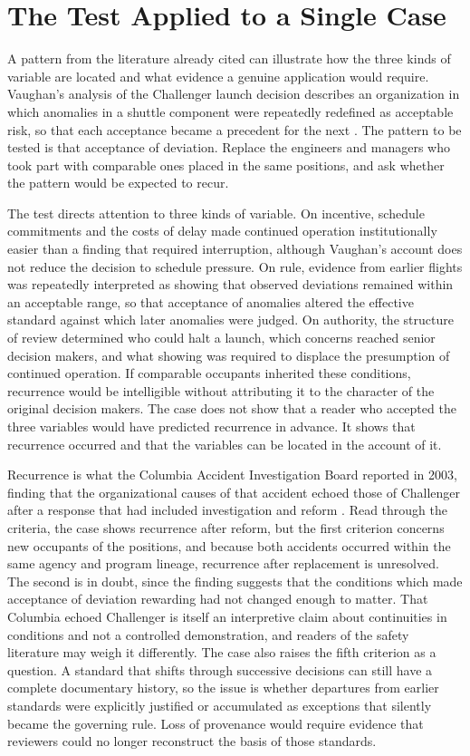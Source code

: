 \documentclass[11pt]{article}
\theoremstyle{definition}
\begin{document}
\section{The Test Applied to a Single Case}

A pattern from the literature already cited can illustrate how the three kinds of variable are located and what evidence a genuine application would require. Vaughan's analysis of the Challenger launch decision describes an organization in which anomalies in a shuttle component were repeatedly redefined as acceptable risk, so that each acceptance became a precedent for the next \cite{vaughan1996}. The pattern to be tested is that acceptance of deviation. Replace the engineers and managers who took part with comparable ones placed in the same positions, and ask whether the pattern would be expected to recur.

The test directs attention to three kinds of variable. On incentive, schedule commitments and the costs of delay made continued operation institutionally easier than a finding that required interruption, although Vaughan's account does not reduce the decision to schedule pressure. On rule, evidence from earlier flights was repeatedly interpreted as showing that observed deviations remained within an acceptable range, so that acceptance of anomalies altered the effective standard against which later anomalies were judged. On authority, the structure of review determined who could halt a launch, which concerns reached senior decision makers, and what showing was required to displace the presumption of continued operation. If comparable occupants inherited these conditions, recurrence would be intelligible without attributing it to the character of the original decision makers. The case does not show that a reader who accepted the three variables would have predicted recurrence in advance. It shows that recurrence occurred and that the variables can be located in the account of it.

Recurrence is what the Columbia Accident Investigation Board reported in 2003, finding that the organizational causes of that accident echoed those of Challenger after a response that had included investigation and reform \cite{caib2003}. Read through the criteria, the case shows recurrence after reform, but the first criterion concerns new occupants of the positions, and because both accidents occurred within the same agency and program lineage, recurrence after replacement is unresolved. The second is in doubt, since the finding suggests that the conditions which made acceptance of deviation rewarding had not changed enough to matter. That Columbia echoed Challenger is itself an interpretive claim about continuities in conditions and not a controlled demonstration, and readers of the safety literature may weigh it differently. The case also raises the fifth criterion as a question. A standard that shifts through successive decisions can still have a complete documentary history, so the issue is whether departures from earlier standards were explicitly justified or accumulated as exceptions that silently became the governing rule. Loss of provenance would require evidence that reviewers could no longer reconstruct the basis of those standards.
\end{document}

